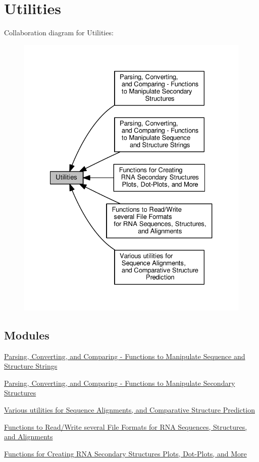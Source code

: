 \hypertarget{group__utils}{}\section{Utilities}
\label{group__utils}
Collaboration diagram for Utilities\+:
\nopagebreak
\begin{figure}[H]
\begin{center}
\leavevmode
\includegraphics[width=327pt]{group__utils}
\end{center}
\end{figure}
\subsection*{Modules}
\begin{DoxyCompactItemize}
\item 
\hyperlink{group__string__utils}{Parsing, Converting, and Comparing -\/ Functions to Manipulate Sequence and Structure Strings}
\item 
\hyperlink{group__struct__utils}{Parsing, Converting, and Comparing -\/ Functions to Manipulate Secondary Structures}
\item 
\hyperlink{group__aln__utils}{Various utilities for Sequence Alignments, and Comparative Structure Prediction}
\item 
\hyperlink{group__file__utils}{Functions to Read/\+Write several File Formats for R\+N\+A Sequences, Structures, and Alignments}
\item 
\hyperlink{group__plotting__utils}{Functions for Creating R\+N\+A Secondary Structures Plots, Dot-\/\+Plots, and More}
\end{DoxyCompactItemize}

